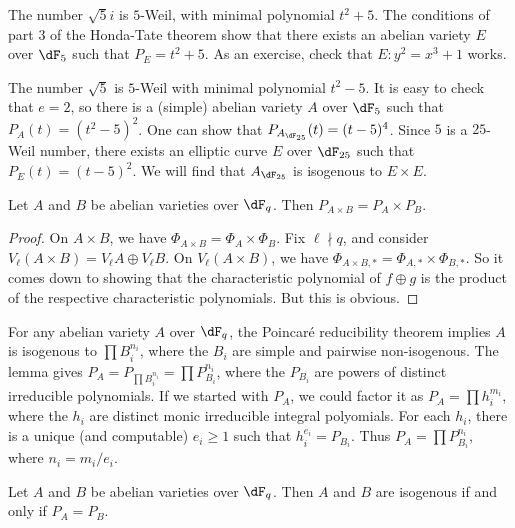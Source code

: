 \documentclass{article}
\begin{document}
\begin{example}
The number $\sqrt 5 i$ is $5$-Weil, with minimal polynomial $t^2+5$. The 
conditions of part 3 of the Honda-Tate theorem show that there exists an 
abelian variety $E$ over $\dF_5$ such that $P_E=t^2+5$. As an exercise, check 
that $E:y^2=x^3+1$ works. 
\end{example}

\begin{example}
The number $\sqrt 5$ is $5$-Weil with minimal polynomial $t^2-5$. It is easy to 
check that $e=2$, so there is a (simple) abelian variety $A$ over $\dF_5$ such 
that $P_A(t) = (t^2-5)^2$. One can show that $P_{A_{\dF_{25}}}(t) = (t-5)^4$. 
Since $5$ is a $25$-Weil number, there exists an elliptic curve $E$ over 
$\dF_{25}$ such that $P_E(t)=(t-5)^2$. We will find that $A_{\dF_{25}}$ is 
isogenous to $E\times E$. 
\end{example}






\begin{lemma}
Let $A$ and $B$ be abelian varieties over $\dF_q$. Then 
$P_{A\times B}=P_A\times P_B$. 
\end{lemma}
\begin{proof}
On $A\times B$, we have $\Phi_{A\times B}=\Phi_A\times \Phi_B$. Fix 
$\ell\nmid q$, and consider $V_\ell(A\times B)=V_\ell A\oplus V_\ell B$. On 
$V_\ell(A\times B)$, we have 
$\Phi_{A\times B,\ast} = \Phi_{A,\ast}\times \Phi_{B,\ast}$. So it comes down 
to showing that the characteristic polynomial of $f\oplus g$ is the product of 
the respective characteristic polynomials. But this is obvious. 
\end{proof}

For any abelian variety $A$ over $\dF_q$, the Poincar\'e reducibility theorem 
implies $A$ is isogenous to $\prod B_i^{n_i}$, where the $B_i$ are simple and 
pairwise non-isogenous. The lemma gives 
$P_A=P_{\prod B_i^{n_i}} = \prod P_{B_i}^{n_i}$, where the $P_{B_i}$ are powers 
of distinct irreducible polynomials. If we started with $P_A$, we could factor 
it as $P_A=\prod h_i^{m_i}$, where the $h_i$ are distinct monic irreducible 
integral polyomials. For each $h_i$, there is a unique (and computable) 
$e_i\geqslant 1$ such that $h_i^{e_i} = P_{B_i}$. Thus 
$P_A=\prod P_{B_i}^{n_i}$, where $n_i=m_i/e_i$. 

\begin{theorem}
Let $A$ and $B$ be abelian varieties over $\dF_q$. Then $A$ and $B$ are 
isogenous if and only if $P_A=P_B$.
\end{theorem}
\end{document}
